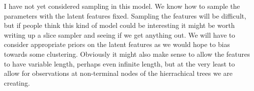 \documentclass[11pt]{article}
\begin{document}
I have not yet considered sampling in this model.  We know how to sample the parameters with the latent features fixed.  Sampling the features will be difficult, but if people think this kind of model could be interesting it might be worth writing up a slice sampler and seeing if we get anything out.  We will have to consider appropriate priors on the latent features as we would hope to bias towards some clustering.  Obviously it might also make sense to allow the features to have variable length, perhaps even infinite length, but at the very least to allow for observations at non-terminal nodes of the hierrachical trees we are creating.
\end{document}

